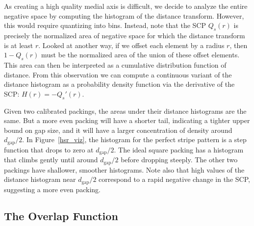 \newtext
{As creating a high quality medial axis is difficult,
we decide to analyze the entire negative space by computing the histogram of the distance transform.}
However, this would require quantizing  into bins.
Instead, note that the SCP $Q_s(r)$ is precisely the normalized area of 
negative space for which the distance transform is at least $r$. 
Looked at another way, if we offset each element by a
radius $r$, then $1-Q_s(r)$ must be the normalized 
area of the union of these offset elements.
This area can then be interpreted as 
a cumulative distribution function of distance.  From this observation
we can compute a continuous variant of the distance histogram as a 
probability density function via the derivative of the SCP: $H(r)=-Q_s'(r)$.


Given two calibrated packings, the areas under their distance histograms
are the same.  But a more even packing will have a shorter tail,
indicating a tighter upper bound on gap size, and it will have a larger
concentration of density around $d_\mathrm{gap}/2$.  In Figure~\ref{hsr_viz},
the histogram for the perfect stripe pattern is a step function that drops
to zero at $d_\mathrm{gap}/2$.  The ideal square packing has a histogram
that climbs gently until around $d_\mathrm{gap}/2$ before dropping
steeply.  The other two packings have shallower, smoother histograms.
Note also that high values of the distance histogram near $d_\mathrm{gap}/2$
correspond to a rapid negative change in the SCP, suggesting a more even
packing.




\subsection{The Overlap Function}
\label{section_overlap_function}


